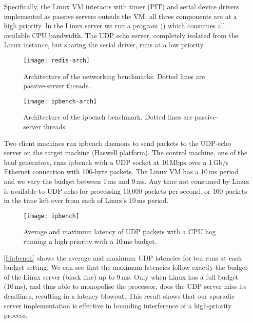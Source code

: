Specifically, the Linux VM interacts with timer (PIT) and serial device drivers implemented as
passive servers outside the VM; all three components are at a high priority. In the Linux server we
run a program () which consumes all available
CPU bandwidth.  The UDP echo server, completely isolated from the Linux instance, but sharing the serial driver,
runs at a low priority.

\begin{figure}[ht]
    \centering
    \texttt{[image: redis-arch]}
    \caption{Architecture of the networking benchmarks. Dotted lines
    \label{f:redis-arch}
    are passive-server threads.}
\end{figure}


\begin{figure}[ht]
    \centering
    \texttt{[image: ipbench-arch]}
    \caption{Architecture of the ipbench benchmark. Dotted lines
    are passive-server threads.}
    \label{f:ipbench-arch}
\end{figure}


Two client machines run ipbench daemons to send packets to the UDP-echo server on the target machine
(Haswell platform). The control machine, one of the load generators, runs ipbench with a \gls{UDP} socket at 10\,Mbps over a 1\,Gb/s Ethernet connection with 100-byte packets. The Linux VM has a 10\,ms period and we vary the
budget between 1\,ms and 9\,ms.
Any time not consumed by Linux is available to UDP echo for processing
10,000 packets per second, or 100 packets in the time left over from
each of Linux's 10\,ms period.

\begin{figure}[t]
  \centering
  \texttt{[image: ipbench]}
  \caption{Average and maximum latency of UDP packets with a
    CPU hog running a high priority with a 10\,ms budget.}
  \label{f:ipbench}
\end{figure}

\autoref{f:ipbench} shows the average and maximum UDP latencies for
ten runs at each budget setting. We can see that the maximum latencies
follow exactly the budget of the Linux server (black line) up to 9\,ms. Only
when Linux has a full budget (10\,ms), and thus able to monopolise the
processor, does the UDP server miss its deadlines, resulting in a
latency blowout.  This result shows that our sporadic server implementation is effective in bounding interference of a high-priority process.

